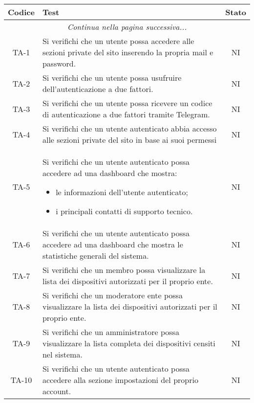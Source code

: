 		\begin{center}
			\begin{longtable}{|c|p{10cm}|c|}
			\hline
			\rowcolor{lighter-grayer}
			\textbf{Codice} & \textbf{Test} & \textbf{Stato}  \\
			\hline
			\endhead
			\hline
	        \multicolumn{3}{|c|}{\textit{Continua nella pagina successiva...}}\\
	        \hline
	        \endfoot
	        \endlastfoot

			\hline
			 TA-1 & Si verifichi che un utente possa accedere alle sezioni private del sito inserendo la propria mail e password.
			  & NI \\
			 \hline
			 TA-2 & Si verifichi che un utente possa usufruire dell'autenticazione a due fattori. & NI \\
			 \hline
			 TA-3 & Si verifichi che un utente possa ricevere un codice di autenticazione a due fattori tramite Telegram. & NI \\
			 \hline
			 TA-4 & Si verifichi che un utente autenticato abbia accesso alle sezioni private del sito in base ai suoi permessi & NI \\
			 \hline
			 TA-5 & Si verifichi che un utente autenticato possa accedere ad una dashboard che mostra:
			 \begin{itemize}
			 	\item le informazioni dell'utente autenticato;
			 	\item i principali contatti di supporto tecnico.
			 \end{itemize} & NI \\
			 \hline
			 TA-6 & Si verifichi che un utente autenticato possa accedere ad una dashboard che mostra le statistiche generali del sistema. & NI \\
			 \hline
			 TA-7 & Si verifichi che un membro possa visualizzare la lista dei dispositivi autorizzati per il proprio ente. & NI \\
			 \hline
			 TA-8 & Si verifichi che un moderatore ente possa visualizzare la lista dei dispositivi autorizzati per il proprio ente. & NI \\
			 \hline
			 TA-9 & Si verifichi che un amministratore possa visualizzare la lista completa dei dispositivi censiti nel sistema. & NI \\
			 \hline
			 TA-10 & Si verifichi che un utente autenticato possa accedere alla sezione impostazioni del proprio account. & NI \\

\end{longtable}
\end{center}
